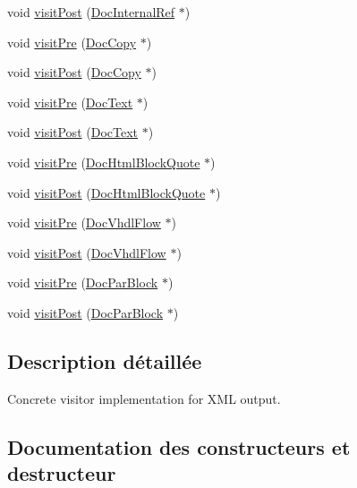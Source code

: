 \begin{DoxyCompactItemize}
\item 
void \hyperlink{class_xml_doc_visitor_a0619cfbeb483b62746c21aedf8e42d70}{visit\+Post} (\hyperlink{class_doc_internal_ref}{Doc\+Internal\+Ref} $\ast$)
\item 
void \hyperlink{class_xml_doc_visitor_a0d7058ee3019ed4d408f1007282ad372}{visit\+Pre} (\hyperlink{class_doc_copy}{Doc\+Copy} $\ast$)
\item 
void \hyperlink{class_xml_doc_visitor_a4a7197cd159863b7e337d3432b41d8b8}{visit\+Post} (\hyperlink{class_doc_copy}{Doc\+Copy} $\ast$)
\item 
void \hyperlink{class_xml_doc_visitor_a7bd42db019ef1160b2e109a13d3c38ff}{visit\+Pre} (\hyperlink{class_doc_text}{Doc\+Text} $\ast$)
\item 
void \hyperlink{class_xml_doc_visitor_a41a17055f4bda0c651417ae0f454aadf}{visit\+Post} (\hyperlink{class_doc_text}{Doc\+Text} $\ast$)
\item 
void \hyperlink{class_xml_doc_visitor_a78ffc45bc2d146fdace63240f8c1dbf8}{visit\+Pre} (\hyperlink{class_doc_html_block_quote}{Doc\+Html\+Block\+Quote} $\ast$)
\item 
void \hyperlink{class_xml_doc_visitor_a621e8d7882167c3d45b7da8e605a9e10}{visit\+Post} (\hyperlink{class_doc_html_block_quote}{Doc\+Html\+Block\+Quote} $\ast$)
\item 
void \hyperlink{class_xml_doc_visitor_af753298e31efde07690eba68b1ac77b4}{visit\+Pre} (\hyperlink{class_doc_vhdl_flow}{Doc\+Vhdl\+Flow} $\ast$)
\item 
void \hyperlink{class_xml_doc_visitor_a84e7b0e6969242cecb24d9b39b8cbdd2}{visit\+Post} (\hyperlink{class_doc_vhdl_flow}{Doc\+Vhdl\+Flow} $\ast$)
\item 
void \hyperlink{class_xml_doc_visitor_a1e600cad83ff588c8fc074da36f29af2}{visit\+Pre} (\hyperlink{class_doc_par_block}{Doc\+Par\+Block} $\ast$)
\item 
void \hyperlink{class_xml_doc_visitor_a0f455554b1e7339d196056212bab4959}{visit\+Post} (\hyperlink{class_doc_par_block}{Doc\+Par\+Block} $\ast$)
\end{DoxyCompactItemize}


\subsection{Description détaillée}
Concrete visitor implementation for X\+M\+L output. 

\subsection{Documentation des constructeurs et destructeur}
\hypertarget{class_xml_doc_visitor_a98b67fb17b406a4e5527764c3ab0568c}{}
